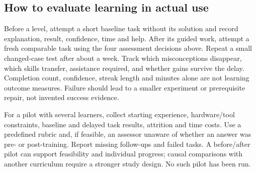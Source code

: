 \subsection{How to evaluate learning in actual use}
Before a level, attempt a short baseline task without its solution and record
explanation, result, confidence, time and help. After its guided work, attempt a
fresh comparable task using the four assessment decisions above. Repeat a small
changed-case test after about a week. Track which misconceptions disappear, which
skills transfer, assistance required, and whether gains survive the delay.
Completion count, confidence, streak length and minutes alone are not learning
outcome measures. Failure should lead to a smaller experiment or prerequisite
repair, not invented success evidence.

For a pilot with several learners, collect starting experience, hardware/tool
constraints, baseline and delayed task results, attrition and time costs. Use a
predefined rubric and, if feasible, an assessor unaware of whether an answer was
pre- or post-training. Report missing follow-ups and failed tasks. A before/after
pilot can support feasibility and individual progress; causal comparisons with
another curriculum require a stronger study design. No such pilot has been run.



